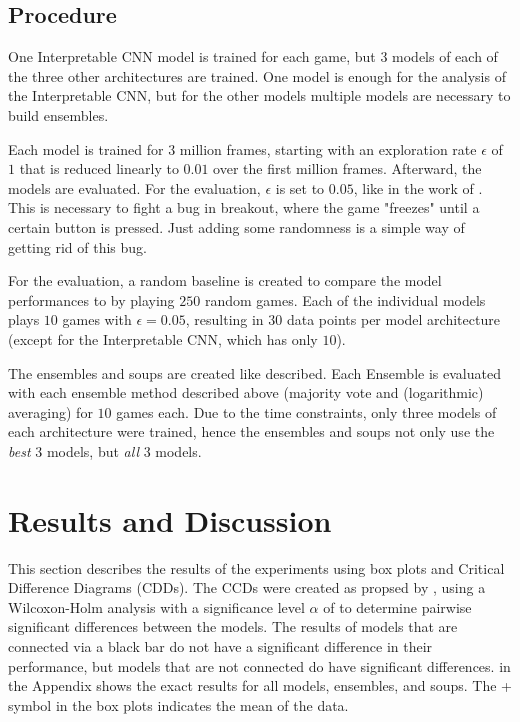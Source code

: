 \section{Procedure}
One Interpretable CNN model is trained for each game, but 3 models of each of the three other architectures are trained. One model is enough for the analysis of the Interpretable CNN, but for the other models multiple models are necessary to build ensembles.

Each model is trained for 3 million frames, starting with an exploration rate $\epsilon$ of $1$ that is reduced linearly to $0.01$ over the first million frames. Afterward, the models are evaluated. For the evaluation, $\epsilon$ is set to $0.05$, like in the work of \textcite{mnih_playing_2013}. This is necessary to fight a bug in breakout, where the game "freezes" until a certain button is pressed. Just adding some randomness is a simple way of getting rid of this bug.

For the evaluation, a random baseline is created to compare the model performances to by playing $250$ random games. Each of the individual models plays $10$ games with $\epsilon = 0.05$, resulting in $30$ data points per model architecture (except for the Interpretable CNN, which has only $10$).

The ensembles and soups are created like described. Each Ensemble is evaluated with each ensemble method described above (majority vote and (logarithmic) averaging) for $10$ games each. Due to the time constraints, only three models of each architecture were trained, hence the ensembles and soups not only use the \emph{best} $3$ models, but \emph{all} $3$ models.

\chapter{Results and Discussion}

This section describes the results of the experiments using box plots and Critical Difference Diagrams (CDDs). The CCDs were created as propsed by \textcite{ismail_fawaz_deep_2019}, using a Wilcoxon-Holm analysis with a significance level $\alpha$ of to determine pairwise significant differences between the models. The results of models that are connected via a black bar do not have a significant difference in their performance, but models that are not connected do have significant differences.  in the Appendix shows the exact results for all models, ensembles, and soups. The + symbol in the box plots indicates the mean of the data.


